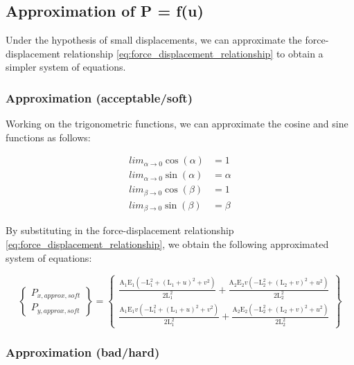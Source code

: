 \subsection{Approximation of P = f(u)}
\label{subsec:approximation}

Under the hypothesis of small displacements, we can approximate the force-displacement relationship \ref{eq:force_displacement_relationship} to obtain a simpler system of equations.


\subsubsection{Approximation (acceptable/soft)}

Working on the trigonometric functions, we can approximate the cosine and sine functions as follows:

\begin{align}
    lim_{\alpha \to 0} \cos(\alpha) & = 1      \\
    lim_{\alpha \to 0} \sin(\alpha) & = \alpha \\
    lim_{\beta \to 0} \cos(\beta)   & = 1      \\
    lim_{\beta \to 0} \sin(\beta)   & = \beta
    \label{eq:trigonometric_approximation_soft}
\end{align}

By substituting in the force-displacement relationship \ref{eq:force_displacement_relationship}, we obtain the following approximated system of equations:

\begin{equation}
    \begin{Bmatrix}
        P_{x,approx,soft} \\
        P_{y,approx,soft}
    \end{Bmatrix}
    =
    \begin{Bmatrix}
        \frac{\text{A}_1 \text{E}_1 \left(-\text{L}_1^2+(\text{L}_1+u)^2+v^2\right)}{2 \text{L}_1^2}+\frac{\text{A}_2 \text{E}_2 v \left(-\text{L}_2^2+(\text{L}_2+v)^2+u^2\right)}{2 \text{L}_2^2} \\
        \frac{\text{A}_1 \text{E}_1 v \left(-\text{L}_1^2+(\text{L}_1+u)^2+v^2\right)}{2 \text{L}_1^2}+\frac{\text{A}_2 \text{E}_2 \left(-\text{L}_2^2+(\text{L}_2+v)^2+u^2\right)}{2 \text{L}_2^2}
    \end{Bmatrix}
    \label{eq:force_displacement_relationship_approximation_soft}
\end{equation}


\subsubsection{Approximation (bad/hard)}

